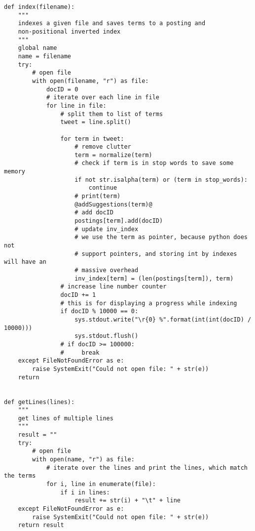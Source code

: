 \documentclass[12pt,pdftex,a4paper]{article}
\begin{document}
\begin{lstlisting}[style=base]
def index(filename):
    """
    indexes a given file and saves terms to a posting and
    non-positional inverted index
    """
    global name
    name = filename
    try:
        # open file
        with open(filename, "r") as file:
            docID = 0
            # iterate over each line in file
            for line in file:
                # split them to list of terms
                tweet = line.split()

                for term in tweet:
                    # remove clutter
                    term = normalize(term)
                    # check if term is in stop words to save some memory
                    if not str.isalpha(term) or (term in stop_words):
                        continue
                    # print(term)
                    @addSuggestions(term)@
                    # add docID
                    postings[term].add(docID)
                    # update inv_index
                    # we use the term as pointer, because python does not
                    # support pointers, and storing int by indexes will have an
                    # massive overhead
                    inv_index[term] = (len(postings[term]), term)
                # increase line number counter
                docID += 1
                # this is for displaying a progress while indexing
                if docID % 10000 == 0:
                    sys.stdout.write("\r{0} %".format(int(int(docID) / 10000)))
                    sys.stdout.flush()
                # if docID >= 100000:
                #     break
    except FileNotFoundError as e:
        raise SystemExit("Could not open file: " + str(e))
    return


def getLines(lines):
    """
    get lines of multiple lines
    """
    result = ""
    try:
        # open file
        with open(name, "r") as file:
            # iterate over the lines and print the lines, which match the terms
            for i, line in enumerate(file):
                if i in lines:
                    result += str(i) + "\t" + line
    except FileNotFoundError as e:
        raise SystemExit("Could not open file: " + str(e))
    return result



\end{lstlisting}
\end{document}
